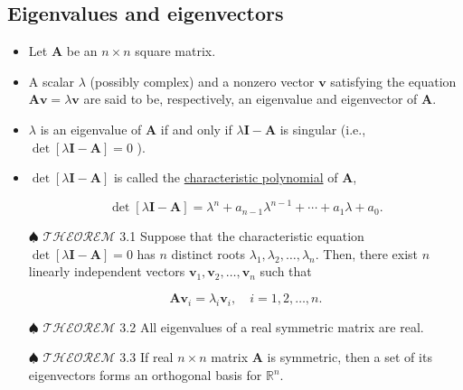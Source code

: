 \documentclass[12pt,thmsa]{article}
\begin{document}
\subsection{Eigenvalues and eigenvectors}
\begin{itemize}
	\item Let \(\boldsymbol{A}\) be an \(n \times n\) square matrix.
	
	\item A scalar \(\lambda\) (possibly complex) and a nonzero vector \(\boldsymbol{v}\) satisfying the equation \(\boldsymbol{A} \boldsymbol{v}=\lambda \boldsymbol{v}\) are said to be, respectively, an eigenvalue and eigenvector of \(\boldsymbol{A}\).
	
	\item \(\lambda\) is an eigenvalue of \(\boldsymbol{A}\) if and only if \(\lambda \boldsymbol{I}-\boldsymbol{A}\) is singular (i.e., \(\operatorname{det}[\lambda \boldsymbol{I}-\boldsymbol{A}]=0\) ).
	
	\item \(\operatorname{det}[\lambda \boldsymbol{I}-\boldsymbol{A}]\) is called the \underline{characteristic polynomial} of \(\boldsymbol{A}\),
	
	\begin{equation*}
		\operatorname{det}[\lambda \boldsymbol{I}-\boldsymbol{A}]=\lambda^{n}+a_{n-1} \lambda^{n-1}+\cdots+a_{1} \lambda+a_{0}.
	\end{equation*}
	
	\item[\(\spadesuit\)] \(\mathscr{THEOREM}\) 3.1 Suppose that the characteristic equation \(\operatorname{det}[\lambda \boldsymbol{I}-\boldsymbol{A}]=0\) has \(n\) distinct roots \(\lambda_{1}, \lambda_{2}, \ldots, \lambda_{n}\). Then, there exist \(n\) linearly independent vectors \(\boldsymbol{v}_{1}, \boldsymbol{v}_{2}, \ldots, \boldsymbol{v}_{n}\) such that
	
	\begin{equation*}
		\boldsymbol{A} \boldsymbol{v}_{i}=\lambda_{i} \boldsymbol{v}_{i}, \quad i=1,2, \ldots, n.
	\end{equation*}

	\item[\(\spadesuit\)] \(\mathscr{THEOREM}\) 3.2 All eigenvalues of a real symmetric matrix are real.
	
	\item[\(\spadesuit\)] \(\mathscr{THEOREM}\) 3.3 If real \( n \times n\) matrix \(\boldsymbol{A}\) is symmetric, then a set of its eigenvectors forms an orthogonal basis for \(\mathbb{R}^{n}\).
	
	
\end{itemize}
\end{document}
